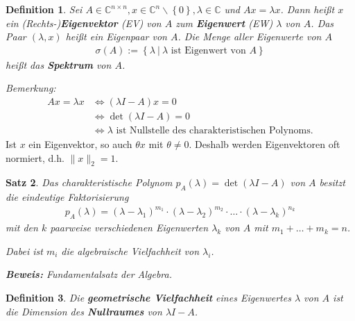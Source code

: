 \documentclass[%
a4paper,
11pt,		%
]
{scrartcl}
\theoremstyle{plain}
\newtheorem{mydef}{Definition}[section]
\theoremstyle{plain}
\newtheorem{mysatz}[mydef]{Satz}
\theoremstyle{plain}
\theoremstyle{plain}
\begin{document}
\begin{mydef}
Sei $A \in \mathbb{C}^{n \times n}, x \in \mathbb{C}^n \backslash \left\{ 0 \right\}, \lambda \in \mathbb{C}$ und $Ax = \lambda x$. Dann heißt $x$ ein (Rechts-)\textbf{Eigenvektor} (EV) von $A$ zum \textbf{Eigenwert} (EW) $\lambda$ von $A$. Das Paar $(\lambda, x)$ heißt ein Eigenpaar von $A$. Die Menge aller Eigenwerte von $A$
\begin{align*}
\sigma(A) := \left\{ \lambda \ | \ \lambda \text{ ist Eigenwert von } A \right\}
\end{align*}
heißt das \textbf{Spektrum} von $A$.
\end{mydef}
\textit{Bemerkung:}\\[-1.3cm] %
\begin{align*}
Ax = \lambda x & \Leftrightarrow (\lambda I - A)x = 0 \\
 & \Leftrightarrow \det(\lambda I - A)=0\\
 & \Leftrightarrow \lambda \text{ ist Nullstelle des charakteristischen Polynoms.}
\end{align*}
Ist $x$ ein Eigenvektor, so auch $\theta x$ mit $\theta \neq 0$. Deshalb werden Eigenvektoren oft normiert, d.h. $\| x \|_2=1$.\\

\begin{mysatz}
Das charakteristische Polynom $p_A(\lambda) = \det(\lambda I - A)$ von $A$ besitzt die eindeutige Faktorisierung
\begin{align*}
p_A(\lambda) = (\lambda - \lambda_1)^{m_1} \cdot (\lambda - \lambda_2)^{m_2} \cdot \ldots \cdot (\lambda - \lambda_k)^{n_k}
\end{align*}
mit den $k$ paarweise verschiedenen Eigenwerten $\lambda_k$ von $A$ mit $m_1 + \ldots + m_k = n$.

Dabei ist $m_i$ die algebraische Vielfachheit von $\lambda_i$.\newline

\textbf{Beweis:} Fundamentalsatz der Algebra.
\end{mysatz}

\begin{mydef}
  Die \textbf{geometrische Vielfachheit} eines Eigenwertes $\lambda$ von $A$ ist die Dimension des \textbf{Nullraumes} von $\lambda I -A$.
\end{mydef}

\end{document}
